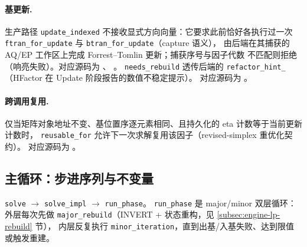 \paragraph{基更新.}
生产路径 \texttt{update\_indexed} 不接收显式方向向量：它要求此前恰好各执行过一次
\texttt{ftran\_for\_update} 与 \texttt{btran\_for\_update}（capture 语义），
由后端在其捕获的 AQ/EP 工作区上完成 Forrest--Tomlin 更新；捕获序号与因子代数
不匹配则拒绝（响亮失败）。对应源码为
、
。
\texttt{needs\_rebuild} 透传后端的 \texttt{refactor\_hint\_}（HFactor 在
Update 阶段报告的数值不稳定提示）。
对应源码为 。

\paragraph{跨调用复用.}
仅当矩阵对象地址不变、基位置序逐元素相同、且持久化的 eta 计数等于当前更新计数时，
\texttt{reusable\_for} 允许下一次求解复用该因子（revised-simplex 重优化契约）。
对应源码为 。

\subsection{主循环：步进序列与不变量}
\label{subsec:engine-lp-mainloop}

\texttt{solve} $\to$ \texttt{solve\_impl} $\to$ \texttt{run\_phase}。
\texttt{run\_phase} 是 major/minor 双层循环：外层每次先做
\texttt{major\_rebuild}（INVERT + 状态重构，见 \ref{subsec:engine-lp-rebuild} 节），
内层反复执行 \texttt{minor\_iteration}，直到出基/入基失败、达到限值或触发重建。

